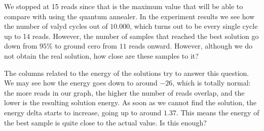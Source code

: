 \begin{table}[H]
	\centering
	\caption{Results of experiment 5, $10.000$ reads using the simulated annealer.}
	\label{tab:exp5_1}
\end{table}

We stopped at 15 reads since that is the maximum value that will be able to compare with using the quantum annealer. In the experiment results we see how the number of valyd cycles out of $10.000$, which turns out to be every single cycle up to 14 reads. However, the number of samples that reached the best solution go down from $95\%$ to ground cero from $11$ reads onward. However, although we do not obtain the real solution, how close are these samples to it?

The columns related to the energy of the solutions try to answer this question. We may see how the energy goes down to around $-26$, which is totally normal: the more reads in our graph, the higher the number of reads overlap, and the lower is the resulting solution energy. As soon as we cannot find the solution, the energy delta starts to increase, going up to around $1.37$. This means the energy of the best sample is quite close to the actual value. Is this enough?

